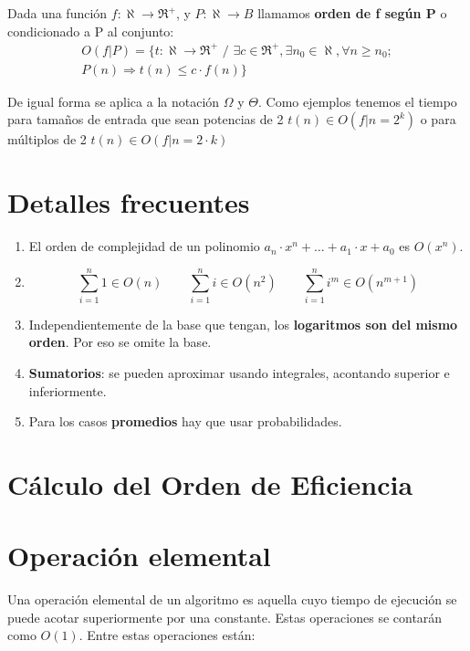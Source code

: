 \documentclass[10pt,a4paper,spanish]{report}
\theoremstyle{definition}
\theoremstyle{remark}
\begin{document}
    Dada una función $f:\aleph \rightarrow \Re^+$, y $P:\aleph \rightarrow B$ llamamos \textbf{\textcolor{YellowOrange}{orden de f según P}} o condicionado a P al conjunto:
    \begin{align*}
        O(f|P) = \{t:\aleph \rightarrow \Re^+ \textbf{ / }
        \exists c \in \Re^+, \exists n_0 \in \aleph, \forall n \ge n_0;\\
        P(n) \Rightarrow t(n) \leq c \cdot f(n) \}
    \end{align*}

    De igual forma se aplica a la notación $\Omega$ y $\Theta$. Como ejemplos tenemos el tiempo para tamaños de entrada que sean potencias de 2 $t(n) \in O(f|n = 2^k)$ o para múltiplos de 2 $t(n) \in O(f | n = 2\cdot k) $

    \section{\textcolor{YellowOrange}Detalles frecuentes}
    \begin{enumerate}
        \item El orden de complejidad de un polinomio $a_n\cdot x^n+\ldots+a_1\cdot x + a_0$ es $O(x^n)$.
        \item $$\sum_{i=1}^{n} 1 \in O(n) \qquad \sum_{i=1}^{n} i \in O(n^2) \qquad \sum_{i=1}^{n} i^m \in O(n^{m+1})$$
        \item Independientemente de la base que tengan, los \textbf{\textcolor{YellowOrange}{logaritmos son del mismo orden}}. Por eso se omite la base.
        \item \textbf{\textcolor{YellowOrange}{Sumatorios}}: se pueden aproximar usando integrales, acontando superior e inferiormente.
        \item Para los casos \textbf{\textcolor{YellowOrange}{promedios}} hay que usar probabilidades.
    \end{enumerate}

    \section{\textcolor{YellowOrange}Cálculo del Orden de Eficiencia}

    \section{\textcolor{YellowOrange}Operación elemental}
    \label{ops_simples}
    Una operación elemental de un algoritmo es aquella cuyo tiempo de ejecución se puede acotar superiormente por una constante. Estas operaciones se contarán como $O(1)$. Entre estas operaciones están: 
\end{document}
